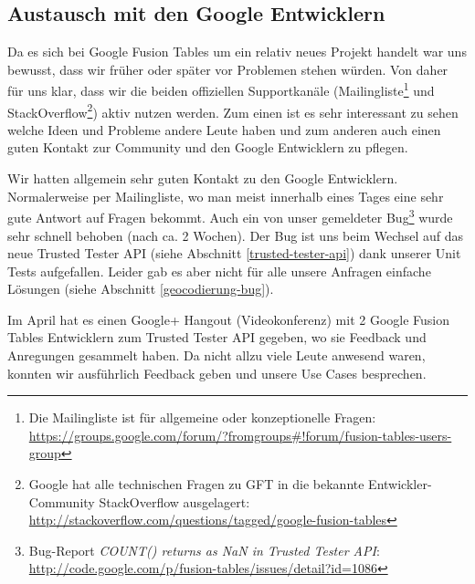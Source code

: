 \subsection{Austausch mit den Google Entwicklern}
\label{austausch-mit-google}
Da es sich bei Google Fusion Tables um ein relativ neues Projekt handelt war uns bewusst, dass wir früher oder später vor Problemen stehen würden. Von daher für uns klar, dass wir die beiden offiziellen Supportkanäle (Mailingliste\footnote{Die Mailingliste ist für allgemeine oder konzeptionelle Fragen: \url{https://groups.google.com/forum/?fromgroups\#!forum/fusion-tables-users-group}} und StackOverflow\footnote{Google hat alle technischen Fragen zu GFT in die bekannte Entwickler-Community StackOverflow ausgelagert: \url{http://stackoverflow.com/questions/tagged/google-fusion-tables}}) aktiv nutzen werden. Zum einen ist es sehr interessant zu sehen welche Ideen und Probleme andere Leute haben und zum anderen auch einen guten Kontakt zur Community und den Google Entwicklern zu pflegen.

Wir hatten allgemein sehr guten Kontakt zu den Google Entwicklern. Normalerweise per Mailingliste, wo man meist innerhalb eines Tages eine sehr gute Antwort auf Fragen bekommt. Auch ein von unser gemeldeter Bug\footnote{Bug-Report \emph{COUNT() returns as NaN in Trusted Tester API}: \url{http://code.google.com/p/fusion-tables/issues/detail?id=1086}} wurde sehr schnell behoben (nach ca. 2 Wochen). Der Bug ist uns beim Wechsel auf das neue Trusted Tester API (siehe Abschnitt \ref{trusted-tester-api}) dank unserer Unit Tests aufgefallen. Leider gab es aber nicht für alle unsere Anfragen einfache Lösungen (siehe Abschnitt \ref{geocodierung-bug}).

Im April hat es einen Google+ Hangout (Videokonferenz) mit 2 Google Fusion Tables Entwicklern zum Trusted Tester API gegeben, wo sie Feedback und Anregungen gesammelt haben. Da nicht allzu viele Leute anwesend waren, konnten wir ausführlich Feedback geben und unsere Use Cases besprechen.











